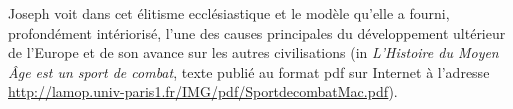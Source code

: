  Joseph  voit dans cet élitisme ecclésiastique et le modèle qu'elle a fourni, profondément intériorisé, l'une des causes principales du développement ultérieur de l'Europe et de son avance sur les autres civilisations (in \emph{L'Histoire du Moyen Âge est un sport de combat}, texte publié au format pdf sur Internet à l'adresse \url{http://lamop.univ-paris1.fr/IMG/pdf/SportdecombatMac.pdf}).
 
 
